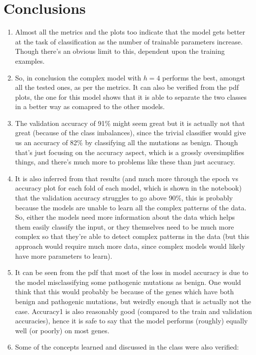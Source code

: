 \documentclass[twoside]{article}
\begin{document}
	
	
	\section{Conclusions}
	\begin{enumerate}
		\item Almost all the metrics and the plots too indicate that the model gets better at the task of classification as the number of trainable parameters increase. Though there's an obvious limit to this, dependent upon the training examples.
		\item So, in conclusion the complex model with $h = 4$ performs the best, amongst all the tested ones, as per the metrics. It can also be verified from the pdf plots, the one for this model shows that it is able to separate the two classes in a better way as comapred to the other models.
		\item The validation accuracy of 91\% might seem great but it is actually not that great (because of the class imbalances), since the trivial classifier would give us an accuracy of 82\% by classifying all the mutations as benign. Though that's just focusing on the accuracy aspect, which is a grossly oversimplifies things, and there's much more to problems like these than just accuracy.
		\item It is also inferred from that results (and much more through the epoch vs accuracy plot for each fold of each model, which is shown in the notebook) that the validation accuracy struggles to go above 90\%, this is probably because the models are unable to learn all the complex patterns of the data. So, either the models need more information about the data which helps them easily classify the input, or they themselves need to be much more complex so that they're able to detect complex patterns in the data (but this approach would require much more data, since complex models would likely have more parameters to learn).
		\item It can be seen from the pdf that most of the loss in model accuracy is due to the model misclassifying some pathogenic mutations as benign. One would think that this would probably be because of the genes which have both benign and pathogenic mutations, but weirdly enough that is actually not the case. Accuracy1 is also reasonably good (compared to the train and validation accuracies), hence it is safe to say that the model performs (roughly) equally well (or poorly) on most genes.
		\item Some of the concepts learned and discussed in the class were also verified:

\end{enumerate}
\end{document}
